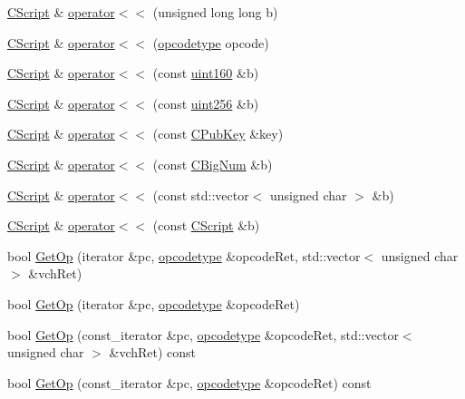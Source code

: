 \begin{DoxyCompactItemize}
\item 
\hyperlink{class_c_script}{C\+Script} \& \hyperlink{class_c_script_a025a2179fab8da2ae60ee23652dc276e}{operator$<$$<$} (unsigned long long b)
\item 
\hyperlink{class_c_script}{C\+Script} \& \hyperlink{class_c_script_af22201e1171b6390b4a06678d00c78d3}{operator$<$$<$} (\hyperlink{script_8h_a63e349a6089a54da9fe09a3d858648bd}{opcodetype} opcode)
\item 
\hyperlink{class_c_script}{C\+Script} \& \hyperlink{class_c_script_a9f0b6c18779332fab3e59f862ed95dea}{operator$<$$<$} (const \hyperlink{classuint160}{uint160} \&b)
\item 
\hyperlink{class_c_script}{C\+Script} \& \hyperlink{class_c_script_a5711a24350f1d24baa88d23ed1ca5868}{operator$<$$<$} (const \hyperlink{classuint256}{uint256} \&b)
\item 
\hyperlink{class_c_script}{C\+Script} \& \hyperlink{class_c_script_a90ca62e4cd7e8c6e90a397f42d6b0564}{operator$<$$<$} (const \hyperlink{class_c_pub_key}{C\+Pub\+Key} \&key)
\item 
\hyperlink{class_c_script}{C\+Script} \& \hyperlink{class_c_script_a05fc4f7c67388701e4af16e8c1d66727}{operator$<$$<$} (const \hyperlink{class_c_big_num}{C\+Big\+Num} \&b)
\item 
\hyperlink{class_c_script}{C\+Script} \& \hyperlink{class_c_script_a6e58790e9f280dd7272ca0d81459b6ef}{operator$<$$<$} (const std\+::vector$<$ unsigned char $>$ \&b)
\item 
\hyperlink{class_c_script}{C\+Script} \& \hyperlink{class_c_script_aa47d739da94465950b3977c04a49f089}{operator$<$$<$} (const \hyperlink{class_c_script}{C\+Script} \&b)
\item 
bool \hyperlink{class_c_script_a94635ed93d8d244ec3acfa83f9ecfe5f}{Get\+Op} (iterator \&pc, \hyperlink{script_8h_a63e349a6089a54da9fe09a3d858648bd}{opcodetype} \&opcode\+Ret, std\+::vector$<$ unsigned char $>$ \&vch\+Ret)
\item 
bool \hyperlink{class_c_script_a913b6f84ecb7ae584200279fa0c064a9}{Get\+Op} (iterator \&pc, \hyperlink{script_8h_a63e349a6089a54da9fe09a3d858648bd}{opcodetype} \&opcode\+Ret)
\item 
bool \hyperlink{class_c_script_ae06205f908e430eaf428922ea3997c1b}{Get\+Op} (const\+\_\+iterator \&pc, \hyperlink{script_8h_a63e349a6089a54da9fe09a3d858648bd}{opcodetype} \&opcode\+Ret, std\+::vector$<$ unsigned char $>$ \&vch\+Ret) const 
\item 
bool \hyperlink{class_c_script_aa1149c27eb60be775652ca862bcb0e23}{Get\+Op} (const\+\_\+iterator \&pc, \hyperlink{script_8h_a63e349a6089a54da9fe09a3d858648bd}{opcodetype} \&opcode\+Ret) const 

\end{DoxyCompactItemize}
